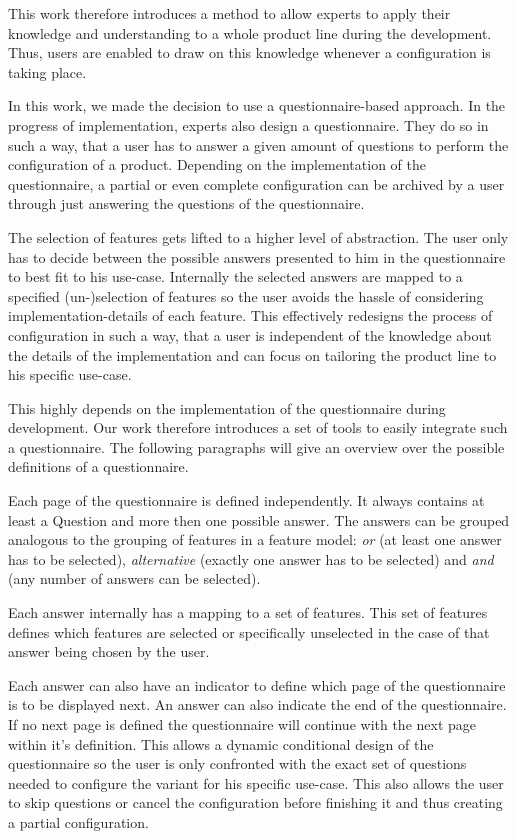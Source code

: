 This work therefore introduces a method to allow experts to apply their knowledge and understanding to a whole product line during the development. Thus, users are enabled to draw on this knowledge whenever a configuration is taking place.

In this work, we made the decision to use a questionnaire-based approach. In the progress of implementation, experts also design a questionnaire. They do so in such a way, that a user has to answer a given amount of questions to perform the configuration of a product. Depending on the implementation of the questionnaire, a partial or even complete configuration can be archived by a user through just answering the questions of the questionnaire.

The selection of features gets lifted to a higher level of abstraction. The user only has to decide between the possible answers presented to him in the questionnaire to best fit to his use-case. Internally the selected answers are mapped to a specified (un-)selection of features so the user avoids the hassle of considering implementation-details of each feature. This effectively redesigns the process of configuration in such a way, that a user is independent of the knowledge about the details of the implementation and can focus on tailoring the product line to his specific use-case.

This highly depends on the implementation of the questionnaire during development. Our work therefore introduces a set of tools to easily integrate such a questionnaire. The following paragraphs will give an overview over the possible definitions of a questionnaire.

Each page of the questionnaire is defined independently. It always contains at least a Question and more then one possible answer. The answers can be grouped analogous to the grouping of features in a feature model: \textit{or} (at least one answer has to be selected), \textit{alternative} (exactly one answer has to be selected) and \textit{and} (any number of answers can be selected).

Each answer internally has a mapping to a set of features. This set of features defines which features are selected or specifically unselected in the case of that answer being chosen by the user.

Each answer can also have an indicator to define which page of the questionnaire is to be displayed next. An answer can also indicate the end of the questionnaire. If no next page is defined the questionnaire will continue with the next page within it's definition. This allows a dynamic conditional design of the questionnaire so the user is only confronted with the exact set of questions needed to configure the variant for his specific use-case. This also allows the user to skip questions or cancel the configuration before finishing it and thus creating a partial configuration.

